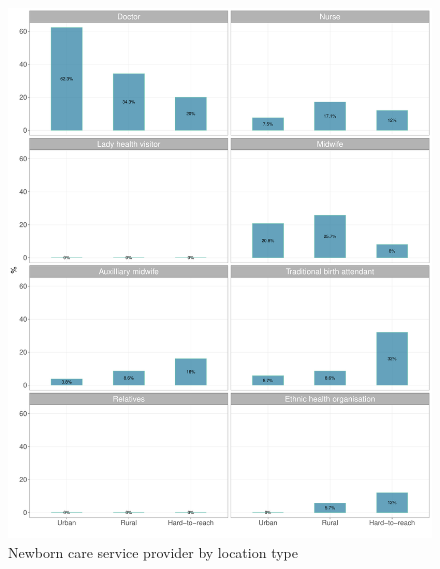 \documentclass[12pt,a4paper]{article}
\begin{document}
\begin{figure}[H]

{\centering \includegraphics{kayinReport_files/figure-latex/nbc3Plot-1} 

}

\caption{Newborn care service provider by location type}\label{fig:nbc3Plot}
\end{figure}
\end{document}
